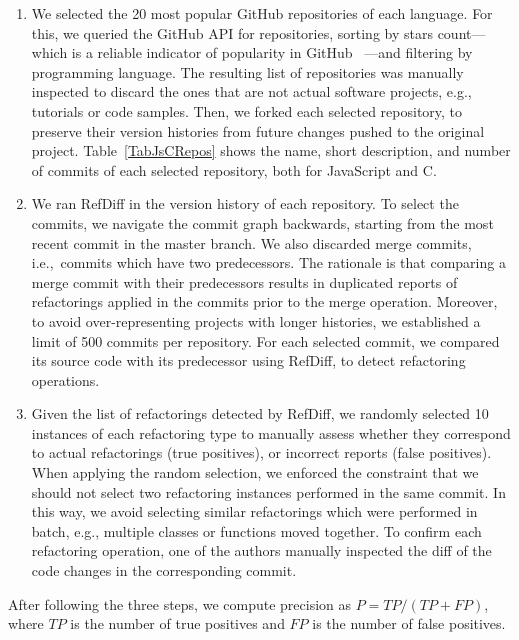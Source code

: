 \documentclass[10pt,journal,compsoc]{IEEEtran}
\begin{document}
\begin{enumerate}  
\item We selected the 20 most popular GitHub repositories of each language. For this, we queried the GitHub API for repositories, sorting by stars count---which is a reliable indicator of popularity in GitHub~\cite{icsme2016,jss-2018-github-stars} ---and filtering by programming language.
The resulting list of repositories was manually inspected to discard the ones that are not actual software projects, e.g., tutorials or code samples. Then, we forked each selected repository, to preserve their version histories from future changes pushed to the original project. Table~\ref{TabJsCRepos} shows the name, short description, and number of commits of each selected repository, both for JavaScript and C.

\item We ran RefDiff in the version history of each repository. To select the commits, we navigate the commit graph backwards, starting from the most recent commit in the master branch. We also discarded merge commits, i.e.,~commits which have two predecessors. The rationale is that comparing a merge commit with their predecessors results in duplicated reports of refactorings applied in the commits prior to the merge operation. Moreover, to avoid over-representing projects with longer histories, we established a limit of 500 commits per repository. For each selected commit, we compared its source code with its predecessor using RefDiff, to detect refactoring operations.

\item Given the list of refactorings detected by RefDiff, we randomly selected 10 instances of each refactoring type to manually assess whether they correspond to actual refactorings (true positives), or incorrect reports (false positives).
When applying the random selection, we enforced the constraint that we should not select two refactoring instances performed in the same commit.
In this way, we avoid selecting similar refactorings which were performed in batch, e.g., multiple classes or functions moved together.
To confirm each refactoring operation, one of the authors manually inspected the diff of the code changes in the corresponding commit.
\end{enumerate}

After following the three steps, we compute precision as $P = \mathit{TP} / (\mathit{TP} + \mathit{FP})$, where $\mathit{TP}$ is the number of true positives and $\mathit{FP}$ is the number of false positives.
\end{document}
